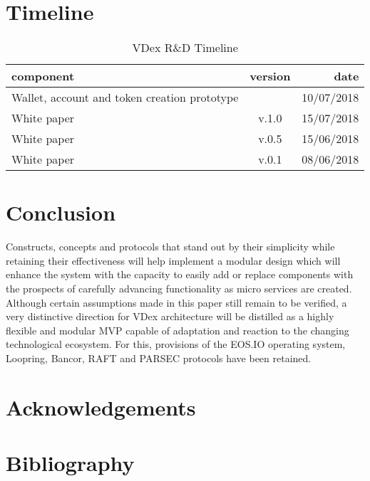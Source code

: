 \documentclass[]{article}
\begin{document}
\paragraph{}	
\section{Timeline}
	
\begin{table}[h!]
	\begin{center}
		\caption{VDex R\&D Timeline}
		\label{tab:table1}
		\begin{tabular}{l|c|r}
			
			\textbf{component} & \textbf{version}&  \textbf{date}  \\
			\hline
			Wallet, account and token creation prototype  &  & 10/07/2018\\
			\hline
			White paper  & v.1.0  & 15/07/2018\\
			\hline
			White paper  & v.0.5 & 15/06/2018\\
			\hline			
			White paper  & v.0.1 & 08/06/2018\\
			\hline
			
			
			
		\end{tabular}
	\end{center}
\end{table}
		
\section{Conclusion}
Constructs, concepts and protocols that stand out by their simplicity
while retaining their effectiveness will help implement a modular
design which will enhance the system with the capacity to easily add or replace components 
with the prospects of carefully advancing functionality as micro services are created.
Although certain assumptions made in this paper still remain to be verified,
a very distinctive direction for VDex architecture will be distilled as a highly flexible and modular MVP 
capable of adaptation and reaction to the changing technological ecosystem.
For this, provisions of the EOS.IO operating system, Loopring, Bancor, RAFT and PARSEC protocols have been retained. 


\section*{Acknowledgements}
\section*{Bibliography}



\cite{1}
\cite{2}
\cite{3}
\cite{4}
\cite{5}
\cite{6}
\cite{7}
\cite{8}
\cite{9}
\cite{10}
\cite{11}
\cite{12}
\cite{13}
\cite{14}
\cite{15}
\cite{16}
\cite{17}
\cite{18}
\cite{19}
\cite{20}
\cite{21}


 
\end{document}
